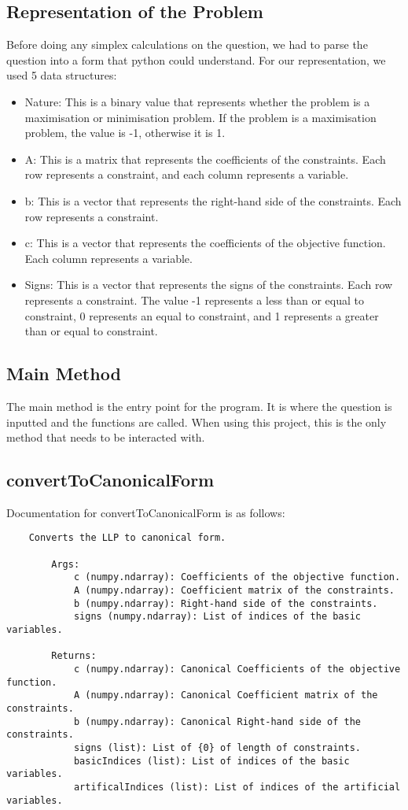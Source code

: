 \documentclass{article}
\numberwithin{equation}{section}
\begin{document}
\subsection{Representation of the Problem}
Before doing any simplex calculations on the question, we had to parse the question into a form that python could understand. For our representation, we used 5 data structures:
\begin{itemize}
    \item Nature: This is a binary value that represents whether the problem is a maximisation or minimisation problem. If the problem is a maximisation problem, the value is -1, otherwise it is 1.
    \item A: This is a matrix that represents the coefficients of the constraints. Each row represents a constraint, and each column represents a variable.
    \item b: This is a vector that represents the right-hand side of the constraints. Each row represents a constraint.
    \item c: This is a vector that represents the coefficients of the objective function. Each column represents a variable.
    \item Signs: This is a vector that represents the signs of the constraints. Each row represents a constraint. The value -1 represents a less than or equal to constraint, 0 represents an equal to constraint, and 1 represents a greater than or equal to constraint.
\end{itemize}
\newpage
\subsection{Main Method}
The main method is the entry point for the program. It is where the question is inputted and the functions are called. When using this project, this is the only method that needs to be interacted with.
\subsection{convertToCanonicalForm}
Documentation for convertToCanonicalForm is as follows:
\begin{lstlisting}
    Converts the LLP to canonical form.

        Args:
            c (numpy.ndarray): Coefficients of the objective function.
            A (numpy.ndarray): Coefficient matrix of the constraints.
            b (numpy.ndarray): Right-hand side of the constraints.
            signs (numpy.ndarray): List of indices of the basic variables.

        Returns:
            c (numpy.ndarray): Canonical Coefficients of the objective function.
            A (numpy.ndarray): Canonical Coefficient matrix of the constraints.
            b (numpy.ndarray): Canonical Right-hand side of the constraints.
            signs (list): List of {0} of length of constraints.
            basicIndices (list): List of indices of the basic variables.
            artificalIndices (list): List of indices of the artificial variables.
\end{lstlisting}
\end{document}
